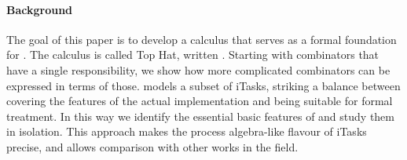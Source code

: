 \paragraph{Background}


The goal of this paper is to develop a calculus that serves as a formal foundation for \TOP.
The calculus is called Top Hat, written \TOPHAT.
Starting with combinators that have a single responsibility, we show how more complicated combinators can be expressed in terms of those.
\TOPHAT models a subset of iTasks, striking a balance between covering the features of the actual implementation and being suitable for formal treatment.
In this way we identify the essential basic features of \TOP and study them in isolation.
This approach makes the process algebra-like flavour of iTasks precise, and allows comparison with other works in the field.
